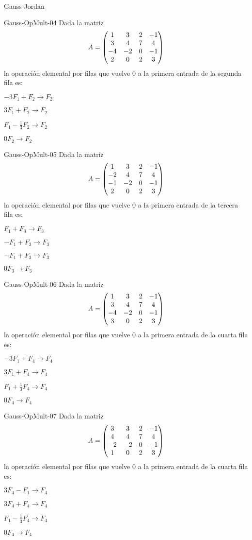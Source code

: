 \documentclass[a4,11pt]{aleph-notas}
\begin{document}
\begin{quiz}{Gauss-Jordan}
\begin{multi}{Gauss-OpMult-04}
    Dada la matriz \[A= \begin{pmatrix} 1 & 3 & 2 & -1 \cr 3 & 4 & 7 & 4  \cr -4 & -2 & 0 & -1 \cr 2 & 0 & 2 & 3\end{pmatrix} \] la operación elemental por filas que vuelve $0$ a la primera entrada de la segunda fila es:
    \item* $-3F_1+F_2\to F_2$
    \item $3F_1+F_2\to F_2$
    \item $F_1-\frac{1}{3}F_2\to F_2$
    \item $0F_2\to F_2$
\end{multi}

\begin{multi}{Gauss-OpMult-05}
    Dada la matriz \[A= \begin{pmatrix} 1 & 3 & 2 & -1 \cr -2 & 4 & 7 & 4  \cr -1 & -2 & 0 & -1 \cr 2 & 0 & 2 & 3\end{pmatrix} \] la operación elemental por filas que vuelve $0$ a la primera entrada de la tercera fila es:
    \item* $F_1+F_3\to F_3$
    \item $-F_1+F_3\to F_3$
    \item $-F_1+F_3\to F_3$
    \item $0F_3\to F_3$
\end{multi}

\begin{multi}{Gauss-OpMult-06}
    Dada la matriz \[A= \begin{pmatrix} 1 & 3 & 2 & -1 \cr 3 & 4 & 7 & 4  \cr -4 & -2 & 0 & -1 \cr 3 & 0 & 2 & 3\end{pmatrix} \] la operación elemental por filas que vuelve $0$ a la primera entrada de la cuarta fila es:
    \item* $-3F_1+F_4\to F_4$
    \item $3F_1+F_4\to F_4$
    \item $F_1+\frac{1}{3}F_4\to F_4$
    \item $0F_4\to F_4$
\end{multi}
 
\begin{multi}{Gauss-OpMult-07}
    Dada la matriz
    \[
        A= \begin{pmatrix} 3 & 3 & 2 & -1 \cr 4 & 4 & 7 & 4  \cr -2 & -2 & 0 & -1 \cr 1 & 0 & 2 & 3\end{pmatrix} 
    \] la operación elemental por filas que vuelve $0$ a la primera entrada de la cuarta fila es:
    \item* $3F_4-F_1\to F_4$
    \item $3F_4+F_4\to F_4$
    \item $F_1-\frac{1}{3}F_4\to F_4$
    \item $0F_4\to F_4$
\end{multi}


\end{quiz}
\end{document}
